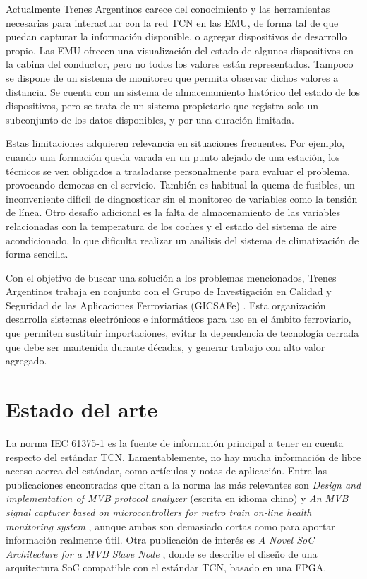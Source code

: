 Actualmente Trenes Argentinos carece del conocimiento y las herramientas necesarias para interactuar con la red TCN en las EMU, de forma tal de que puedan capturar la información disponible, o agregar dispositivos de desarrollo propio.
Las EMU ofrecen una visualización del estado de algunos dispositivos en la cabina del conductor, pero no todos los valores están representados.
Tampoco se dispone de un sistema de monitoreo que permita observar dichos valores a distancia.
Se cuenta con un sistema de almacenamiento histórico del estado de los dispositivos, pero se trata de un sistema propietario que registra solo un subconjunto de los datos disponibles, y por una duración limitada.

Estas limitaciones adquieren relevancia en situaciones frecuentes.
Por ejemplo, cuando una formación queda varada en un punto alejado de una estación, los técnicos se ven obligados a trasladarse personalmente para evaluar el problema, provocando demoras en el servicio.
También es habitual la quema de fusibles, un inconveniente difícil de diagnosticar sin el monitoreo de variables como la tensión de línea.
Otro desafío adicional es la falta de almacenamiento de las variables relacionadas con la temperatura de los coches y el estado del sistema de aire acondicionado, lo que dificulta realizar un análisis del sistema de climatización de forma sencilla.

Con el objetivo de buscar una solución a los problemas mencionados, Trenes Argentinos trabaja en conjunto con el Grupo de Investigación en Calidad y Seguridad de las Aplicaciones Ferroviarias (GICSAFe) \cite{web:gicsafe}. Esta organización desarrolla sistemas electrónicos e informáticos para uso en el ámbito ferroviario, que permiten sustituir importaciones, evitar la dependencia de tecnología cerrada que debe ser mantenida durante décadas, y generar trabajo con alto valor agregado.

\section{Estado del arte}

\label{estadodelarte}

La norma IEC 61375-1 es la fuente de información principal a tener en cuenta respecto del estándar TCN. Lamentablemente, no hay mucha información de libre acceso acerca del estándar, como artículos y notas de aplicación. Entre las publicaciones encontradas que citan a la norma las más relevantes son \textit{Design and implementation of MVB protocol analyzer} \cite{mvb-pub-1} (escrita en idioma chino) y \textit{An MVB signal capturer based on microcontrollers for metro train on-line health monitoring system} \cite{mvb-pub-2}, aunque ambas son demasiado cortas como para aportar información realmente útil.
Otra publicación de interés es \textit{A Novel SoC Architecture for a MVB Slave Node} \cite{mvb-pub-3}, donde se describe el diseño de una arquitectura SoC compatible con el estándar TCN, basado en una FPGA.

